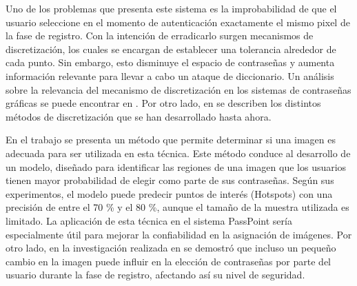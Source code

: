 \documentclass[12pt]{report}
\begin{document}
	Uno de los problemas que presenta este sistema es la improbabilidad de que el usuario seleccione en el momento de autenticación exactamente el mismo pixel de la fase de registro. Con la intención de erradicarlo surgen mecanismos de discretización, los cuales se encargan de establecer una tolerancia alrededor de cada punto. Sin embargo, esto disminuye el espacio de contraseñas y aumenta información relevante para llevar a cabo un ataque de diccionario. Un análisis sobre la relevancia del mecanismo de discretización en los sistemas de contraseñas gráficas se puede encontrar en \cite{14,15,16}. Por otro lado, en \cite{14,15,16,17} se describen los distintos métodos de discretización que se han desarrollado hasta ahora.

	
	En el trabajo \cite{18} se presenta un método que permite determinar si una imagen es adecuada para ser utilizada en esta técnica. Este método conduce al desarrollo de un modelo, diseñado para identificar las regiones de una imagen que los usuarios tienen mayor probabilidad de elegir como parte de sus contraseñas. Según sus experimentos, el modelo puede predecir puntos de interés (Hotspots) con una precisión de entre el 70 \% y el 80 \%, aunque el tamaño de la muestra utilizada es limitado. La aplicación de esta técnica en el sistema PassPoint sería especialmente útil para mejorar la confiabilidad en la asignación de imágenes. Por otro lado, en la investigación realizada en \cite{19} se demostró que incluso un pequeño cambio en la imagen puede influir en la elección de contraseñas por parte del usuario durante la fase de registro, afectando así su nivel de seguridad.   

	 

	
\end{document}
